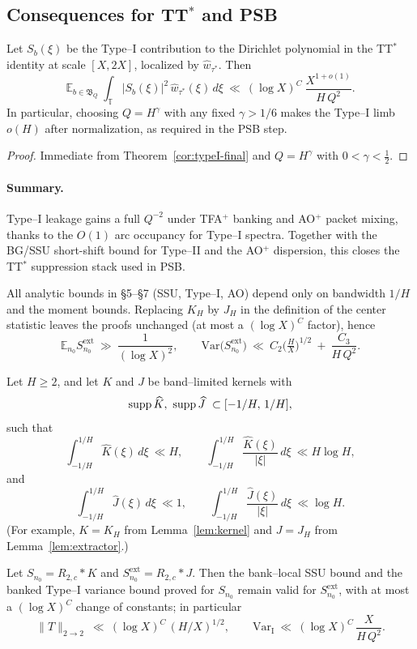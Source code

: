 \subsection{Consequences for TT\texorpdfstring{$^\ast$}{star} and PSB}

\begin{corollary}
\label{cor:typeI-ttstar}
Let $S_b(\xi)$ be the Type–I contribution to the Dirichlet polynomial in the TT$^\ast$ identity at scale $[X,2X]$, localized by $\widehat w_{\tau^\ast}$. Then
\[
\mathbb E_{b\in\mathfrak B_Q}\ \int_{\mathbb{T}} |S_b(\xi)|^2\,\widehat w_{\tau^\ast}(\xi)\,d\xi
\ \ll\ (\log X)^C\ \frac{X^{1+o(1)}}{H\,Q^2}.
\]
In particular, choosing $Q=H^\gamma$ with any fixed $\gamma>1/6$ makes the Type–I limb $o(H)$ after normalization, as required in the PSB step.
\end{corollary}

\begin{proof}
Immediate from Theorem~\ref{cor:typeI-final} and $Q=H^\gamma$ with $0<\gamma<\tfrac12$.
\end{proof}

\paragraph{Summary.}
Type–I leakage gains a full $Q^{-2}$ under TFA$^{+}$ banking and AO$^{+}$ packet mixing, thanks to the $O(1)$ arc occupancy for Type–I spectra. Together with the BG/SSU short-shift bound for Type–II and the AO$^{+}$ dispersion, this closes the TT$^\ast$ suppression stack used in PSB.


\begin{remark}
All analytic bounds in §5–§7 (SSU, Type–I, AO) depend only on bandwidth $1/H$ and the moment bounds. 
Replacing $K_H$ by $J_H$ in the definition of the center statistic leaves the proofs unchanged (at most a $(\log X)^C$ factor), hence
\[
\mathbb E_{n_0}S^{\mathrm{ext}}_{n_0}\ \gg\ \frac{1}{(\log X)^2},\qquad 
\mathrm{Var}\big(S^{\mathrm{ext}}_{n_0}\big)\ \ll\ C_2\Big(\tfrac{H}{X}\Big)^{1/2}\ +\ \frac{C_3}{H\,Q^2}.
\]
\end{remark}

\begin{lemma}\label{lem:kernel-stability}
Let $H\ge2$, and let $K$ and $J$ be band–limited kernels with
\[
\operatorname{supp} \widehat K,\ \operatorname{supp} \widehat J \ \subset [-1/H,\,1/H],
\]
such that
\[
\int_{-1/H}^{1/H}\widehat K(\xi)\,d\xi \ \ll H,\qquad
\int_{-1/H}^{1/H}\frac{\widehat K(\xi)}{|\xi|}\,d\xi \ \ll H\log H,
\]
and
\[
\int_{-1/H}^{1/H}\widehat J(\xi)\,d\xi \ \ll 1,\qquad
\int_{-1/H}^{1/H}\frac{\widehat J(\xi)}{|\xi|}\,d\xi \ \ll \log H.
\]
(For example, $K=K_H$ from Lemma~\ref{lem:kernel} and $J=J_H$ from Lemma~\ref{lem:extractor}.)

Let $S_{n_0} = R_{2,c} * K$ and $S^{\mathrm{ext}}_{n_0} = R_{2,c} * J$. Then the bank–local SSU bound and the banked Type–I variance bound proved for $S_{n_0}$ remain valid for $S^{\mathrm{ext}}_{n_0}$, with at most a $(\log X)^C$ change of constants; in particular
\[
\|T\|_{2\to2} \ \ll\ (\log X)^C\,(H/X)^{1/2},\qquad
\mathrm{Var}_{\mathrm I}\ \ll\ (\log X)^C\,\frac{X}{H\,Q^2}.
\]
\end{lemma}
